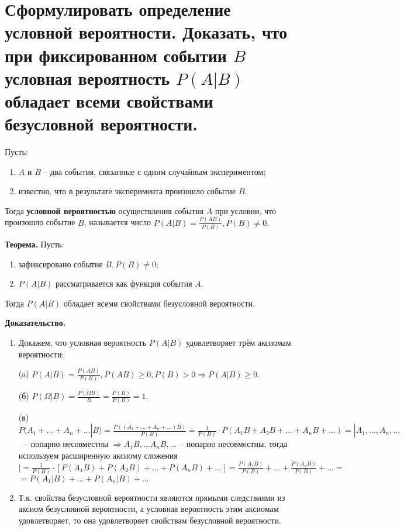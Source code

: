 \section{Сформулировать определение условной вероятности. Доказать, что при фиксированном событии $B$ условная вероятность $P(A|B)$ обладает всеми свойствами безусловной вероятности.}

Пусть:

\begin{enumerate}[label=\arabic*)]
	\item $A$ и $B$ -- два события, связанные с одним случайным экспериментом;
	\item известно, что в результате эксперимента произошло событие $B$.
\end{enumerate}

Тогда \textbf{условной вероятностью} осуществления события $A$ при условии, что произошло событие $B$, называется число $P(A|B) = \frac{P(AB)}{P(B)}, P(B) \neq 0.$

\textbf{Теорема.} Пусть:
\begin{enumerate}[label=\arabic*)]
	\item зафиксировано событие $B, P(B) \neq 0$;
	\item $P(A|B)$ рассматривается как функция события $A$.
\end{enumerate}

Тогда $P(A|B)$ обладает всеми свойствами безусловной вероятности.

\textbf{Доказательство.}
\begin{enumerate}
	\item Докажем, что условная вероятность $P(A|B)$ удовлетворяет трём аксиомам вероятности: 
	
	(a) $P(A|B) = \frac{P(AB)}{P(B)}, P(AB) \geq 0, P(B) > 0 \Rightarrow P(A|B) \geq 0.$
	
	(б) $P(\Omega | B) = \frac{P(\Omega B)}{B} = \frac{P(B)}{P(B)} = 1.$
	
	(в) $P(A_1 + ... + A_n + ... | B) = \frac{P((A_1 + ... + A_n + ...)B)}{P(B)} = \frac{1}{P(B)} \cdot P(A_1B + A_2B + ... + A_nB + ...) = |A_1,...,A_n,...$~--~попарно несовместны $\Rightarrow A_1B,...A_nB,...$ -- попарно несовместны, тогда используем расширенную аксиому сложения$| = \frac{1}{P(B)} \cdot [P(A_1B) + P(A_2B) + ... + P(A_nB) + ...] = \frac{P(A_1B)}{P(B)} + ... + \frac{P(A_nB)}{P(B)} + ... =$ $=P(A_1|B) + ... + P(A_n|B) + ...$
	
	\item Т.к. свойства безусловной вероятности являются прямыми следствиями из аксиом безусловной вероятности, а условная вероятность этим аксиомам удовлетворяет, то она удовлетворяет свойствам безусловной вероятности.
\end{enumerate}

